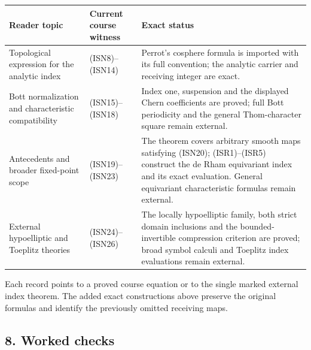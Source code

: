 \documentclass[
  11pt,
]{article}
\newcounter{none} %
\begin{document}
{\def\LTcaptype{none} %
\begin{longtable}[]{@{}
  >{\raggedright\arraybackslash}p{}
  >{\raggedright\arraybackslash}p{}
  >{\raggedright\arraybackslash}p{}@{}}
\toprule\noalign{}
\begin{minipage}[b]{\linewidth}\raggedright
Reader topic
\end{minipage} & \begin{minipage}[b]{\linewidth}\raggedright
Current course witness
\end{minipage} & \begin{minipage}[b]{\linewidth}\raggedright
Exact status
\end{minipage} \\
\midrule\noalign{}
\endhead
\bottomrule\noalign{}
\endlastfoot
Topological expression for the analytic index & (ISN8)--(ISN14) &
Perrot's cosphere formula is imported with its full convention; the
analytic carrier and receiving integer are exact. \\
Bott normalization and characteristic compatibility & (ISN15)--(ISN18) &
Index one, suspension and the displayed Chern coefficients are proved;
full Bott periodicity and the general Thom-character square remain
external. \\
Antecedents and broader fixed-point scope & (ISN19)--(ISN23) & The
theorem covers arbitrary smooth maps satisfying (ISN20); (ISR1)--(ISR5)
construct the de Rham equivariant index and its exact evaluation.
General equivariant characteristic formulas remain external. \\
External hypoelliptic and Toeplitz theories & (ISN24)--(ISN26) & The
locally hypoelliptic family, both strict domain inclusions and the
bounded-invertible compression criterion are proved; broad symbol
calculi and Toeplitz index evaluations remain external. \\
\end{longtable}
}

Each record points to a proved course equation or to the single marked
external index theorem. The added exact constructions above preserve the
original formulas and identify the previously omitted receiving maps.

\subsection{8. Worked checks}\label{worked-checks}
\end{document}
